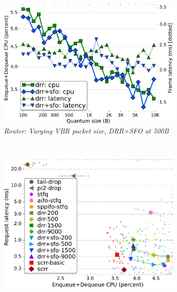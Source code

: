 \begin{figure}[th!]
\begin{subfigure}[t]{.30\linewidth}
  \end{subfigure}
  \begin{subfigure}[t]{.30\linewidth}
    \centering
    \includegraphics[width=0.95\linewidth]{figs/burst_cn_2t4x16_mn_2ui32_css_500_kp_lat_drr_basic_fq_drr.pdf}
    \caption{\small{\textit{Router: Varying VBR packet size, DRR+SFO at 500B}}}
    \label{fig:vbr-1456-drr-full}
  \end{subfigure}
  \\
  \begin{subfigure}[t]{.30\linewidth}
    \centering
    \includegraphics[width=0.95\linewidth]{figs/pkt_size_cn_2t4x8_mn_2tb2x4_per_15_mss_1468_kp_lat_comp_methods.pdf}

\end{subfigure}
\end{figure}
